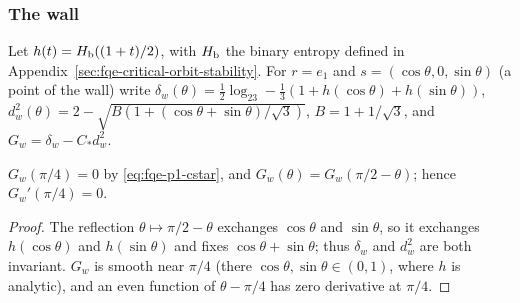 \subsubsection*{The wall}
Let $h(t)=H_{\rm b}((1+t)/2)$, with $H_{\rm b}$ the binary entropy defined in Appendix~\ref{sec:fqe-critical-orbit-stability}.
For $r=e_1$ and $s=(\cos\theta,0,\sin\theta)$ (a point of the wall) write
$\delta_w(\theta)=\frac12\log_23-\frac13(1+h(\cos\theta)+h(\sin\theta))$,
$d_w^2(\theta)=2-\sqrt{B(1+(\cos\theta+\sin\theta)/\sqrt3)}$, $B=1+1/\sqrt3$, and $G_w=\delta_w-C_*d_w^2$.
\begin{lemma}[Wall]\label{lem:fqe-p1-wall}
$G_w(\pi/4)=0$ by \eqref{eq:fqe-p1-cstar}, and $G_w(\theta)=G_w(\pi/2-\theta)$; hence $G_w'(\pi/4)=0$.
\end{lemma}
\begin{proof}
The reflection $\theta\mapsto\pi/2-\theta$ exchanges $\cos\theta$ and $\sin\theta$, so it exchanges $h(\cos\theta)$ and
$h(\sin\theta)$ and fixes $\cos\theta+\sin\theta$; thus $\delta_w$ and $d_w^2$ are both invariant.  $G_w$ is smooth near
$\pi/4$ (there $\cos\theta,\sin\theta\in(0,1)$, where $h$ is analytic), and an even function of $\theta-\pi/4$ has zero
derivative at $\pi/4$.
\end{proof}


